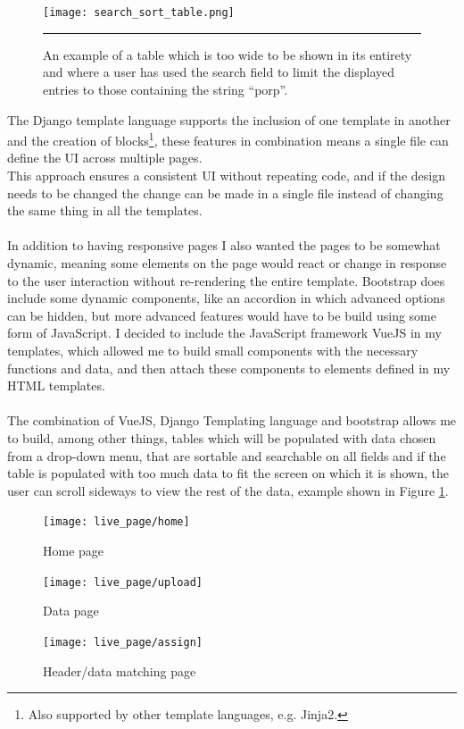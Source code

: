 \\\\
\begin{figure}[t!]
\centering
	\texttt{[image: search\_sort\_table.png]}
	\caption{An example of a table which is too wide to be shown in its entirety and where a user has used the search field to limit the displayed entries to those containing the string ``porp''.}
	\label{fig:table_search_sort}
	\hrule
\end{figure}
The Django template language supports the inclusion of one template in another and the creation of blocks\footnote{Also supported by other template languages, e.g. Jinja2.}, these features in combination means a single file can define the UI across multiple pages.\\This approach ensures a consistent UI without repeating code, and if the design needs to be changed the change can be made in a single file instead of changing the same thing in all the templates.
\\\\
In addition to having responsive pages I also wanted the pages to be somewhat dynamic, meaning some elements on the page would react or change in response to the user interaction without re-rendering the entire template. Bootstrap does include some dynamic components, like an accordion in which advanced options can be hidden, but more advanced features would have to be build using some form of JavaScript. I decided to include the JavaScript framework VueJS in my templates, which allowed me to build small components with the necessary functions and data, and then attach these components to elements defined in my HTML templates.\\\\
The combination of VueJS, Django Templating language and bootstrap allows me to build, among other things, tables which will be populated with data chosen from a drop-down menu, that are sortable and searchable on all fields and if the table is populated with too much data to fit the screen on which it is shown, the user can scroll sideways to view the rest of the data, example shown in Figure \ref{fig:table_search_sort}.
\begin{figure}[H]
\centering
\centering
\texttt{[image: live\_page/home]}
\caption{Home page}
\label{fig:design_home}
\vspace*{0.1cm}
\texttt{[image: live\_page/upload]}
\caption{Data page}
\label{fig:design_data}
\vspace*{0.1cm}
\texttt{[image: live\_page/assign]}
\caption{Header/data matching page}
\label{fig:design_ass}
\end{figure}

